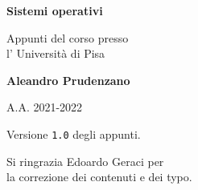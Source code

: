 \begin{titlepage}
    \begin{center}
        \vspace*{1cm}

        \huge
        \textbf{Sistemi operativi}

        \vspace{0.5cm}

        Appunti del corso presso \\ l' Università di Pisa

        \vspace{1.5cm}

        \textbf{Aleandro Prudenzano}

        \vfill
        \vspace{0.8cm}

        A.A. 2021-2022

    \end{center}
\end{titlepage}

\begin{flushright}
    \vspace*{2.0cm}

    Versione \verb{1.0{ degli appunti.

    Si ringrazia Edoardo Geraci per \\
    la correzione dei contenuti e dei typo.
\end{flushright}
\clearpage
\begingroup
  \pagestyle{empty}
  \null
  \newpage
\endgroup

\renewcommand{\contentsname}{Indice}
\tableofcontents

\clearpage
\begingroup
  \pagestyle{empty}
  \null
  \newpage
\endgroup